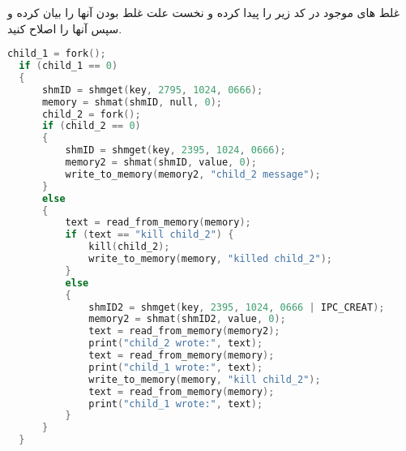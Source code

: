 \documentclass[]{article}
\begin{document}
ﻏﻠﻂ ﻫﺎﯼ ﻣﻮﺟﻮﺩ ﺩﺭ ﮐﺪ ﺯﯾﺮ ﺭﺍ ﭘﯿﺪﺍ ﮐﺮﺩﻩ ﻭ ﻧﺨﺴﺖ ﻋﻠﺖ ﻏﻠﻂ ﺑﻮﺩﻥ ﺁﻧﻬﺎ ﺭﺍ ﺑﯿﺎﻥ ﮐﺮﺩﻩ ﻭ ﺳﭙﺲ ﺁﻧﻬﺎ ﺭﺍ ﺍﺻﻼﺡ ﮐﻨﯿﺪ.

\begin{latin}
    \begin{lstlisting}[language=C]
  child_1 = fork();
  if (child_1 == 0)
  {
      shmID = shmget(key, 2795, 1024, 0666);
      memory = shmat(shmID, null, 0);
      child_2 = fork();
      if (child_2 == 0)
      {
          shmID = shmget(key, 2395, 1024, 0666);
          memory2 = shmat(shmID, value, 0);
          write_to_memory(memory2, "child_2 message");
      }
      else
      {
          text = read_from_memory(memory);
          if (text == "kill child_2") {
              kill(child_2);
              write_to_memory(memory, "killed child_2");
          }
          else
          {
              shmID2 = shmget(key, 2395, 1024, 0666 | IPC_CREAT);
              memory2 = shmat(shmID2, value, 0);
              text = read_from_memory(memory2);
              print("child_2 wrote:", text);
              text = read_from_memory(memory);
              print("child_1 wrote:", text);
              write_to_memory(memory, "kill child_2");
              text = read_from_memory(memory);
              print("child_1 wrote:", text);
          }
      }
  }
\end{lstlisting}
\end{latin}
\end{document}
